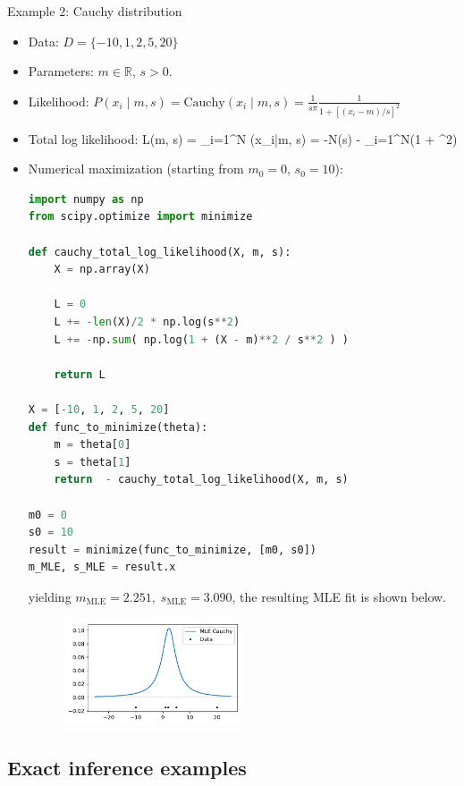 \newpage
\no Example 2: Cauchy distribution
\begin{itemize}
	\item Data: $D = \{-10, 1, 2, 5, 20\}$
	\item Parameters: $m\in \mathds{R}$, \quad $s > 0$.
	\item Likelihood: $P(x_i\;|\;m, s) = \text{Cauchy}(x_i\;|\;m, s) = \frac{1}{s \pi} \frac{1}{1 + \left[(x_i - m)/s\right]^2}$
	\item Total log likelihood:
		\be
			L(m, s) = \sum_{i=1}^N \log {}(x_i\;|\;m, s) = -N\log(s) - \sum_{i=1}^N\log\!\left(1 + ^2\right)
		\ee

	\item Numerical maximization (starting from $m_0 = 0$, $s_0 = 10$):
\begin{lstlisting}[language=python]
import numpy as np
from scipy.optimize import minimize

def cauchy_total_log_likelihood(X, m, s):
    X = np.array(X)
    
    L = 0
    L += -len(X)/2 * np.log(s**2)
    L += -np.sum( np.log(1 + (X - m)**2 / s**2 ) )
    
    return L

X = [-10, 1, 2, 5, 20]
def func_to_minimize(theta):
    m = theta[0]
    s = theta[1]
    return  - cauchy_total_log_likelihood(X, m, s)

m0 = 0
s0 = 10
result = minimize(func_to_minimize, [m0, s0])
m_MLE, s_MLE = result.x
\end{lstlisting}
		yielding $m_\text{MLE} = 2.251, \; s_\text{MLE} = 3.090$, the resulting MLE fit is shown below.
		\begin{figure}[h]
			\centering
			\includegraphics[width=0.5\textwidth]{./figs/Cauchy_MLE.pdf}
		\end{figure}
\end{itemize}

\newpage
\subsection{Exact inference examples}


